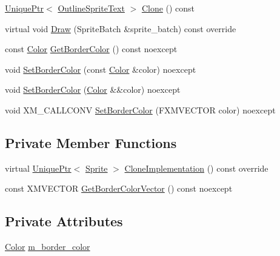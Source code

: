 \begin{DoxyCompactItemize}
\item 
\hyperlink{namespacemage_a3316d7143a973e37adf1110f2e80ca31}{Unique\+Ptr}$<$ \hyperlink{classmage_1_1_outline_sprite_text}{Outline\+Sprite\+Text} $>$ \hyperlink{classmage_1_1_outline_sprite_text_aa188cb104f6f00fdc75c532d66869f02}{Clone} () const
\item 
virtual void \hyperlink{classmage_1_1_outline_sprite_text_a524e9ad1caeeeaa32405e61d1a5e1032}{Draw} (Sprite\+Batch \&sprite\+\_\+batch) const override
\item 
const \hyperlink{structmage_1_1_color}{Color} \hyperlink{classmage_1_1_outline_sprite_text_adb4936119bcc0b148c9e11f021e83940}{Get\+Border\+Color} () const noexcept
\item 
void \hyperlink{classmage_1_1_outline_sprite_text_a66b448443de5a459bb28f66c682a12bd}{Set\+Border\+Color} (const \hyperlink{structmage_1_1_color}{Color} \&color) noexcept
\item 
void \hyperlink{classmage_1_1_outline_sprite_text_a7bd6e4fc0afefb65ca9d543f52941400}{Set\+Border\+Color} (\hyperlink{structmage_1_1_color}{Color} \&\&color) noexcept
\item 
void X\+M\+\_\+\+C\+A\+L\+L\+C\+O\+NV \hyperlink{classmage_1_1_outline_sprite_text_a861b01bf303caf0c08a599f3d4a77894}{Set\+Border\+Color} (F\+X\+M\+V\+E\+C\+T\+OR color) noexcept
\end{DoxyCompactItemize}
\subsection*{Private Member Functions}
\begin{DoxyCompactItemize}
\item 
virtual \hyperlink{namespacemage_a3316d7143a973e37adf1110f2e80ca31}{Unique\+Ptr}$<$ \hyperlink{classmage_1_1_sprite}{Sprite} $>$ \hyperlink{classmage_1_1_outline_sprite_text_ac1fcc7e91b972b250e09fbb8d62f908d}{Clone\+Implementation} () const override
\item 
const X\+M\+V\+E\+C\+T\+OR \hyperlink{classmage_1_1_outline_sprite_text_a287bef30662bbd00ca999b3577249226}{Get\+Border\+Color\+Vector} () const noexcept
\end{DoxyCompactItemize}
\subsection*{Private Attributes}
\begin{DoxyCompactItemize}
\item 
\hyperlink{structmage_1_1_color}{Color} \hyperlink{classmage_1_1_outline_sprite_text_a19301d370498a08759445f415da78822}{m\+\_\+border\+\_\+color}
\end{DoxyCompactItemize}
